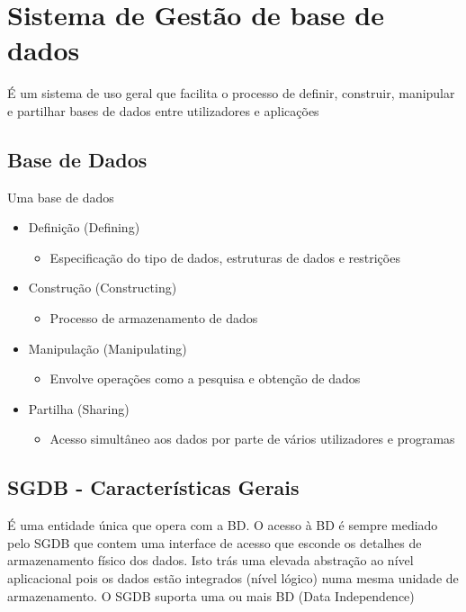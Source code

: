 \documentclass{easyclass}
\begin{document}
\section{Sistema de Gestão de base de dados}

\begin{tcolorbox}[
colframe=blue!25,
colback=blue!10,
coltitle=blue!20!black,  
fonttitle=\bfseries,
adjusted title=(DBMS) Database Management System]
É um sistema de uso geral que facilita o processo de definir, construir, manipular e partilhar bases de dados entre utilizadores e aplicações
\end{tcolorbox}

\subsection{Base de Dados}
Uma base de dados
\begin{itemize}
\item Definição (Defining)

\begin{itemize}
\item Especificação do tipo de dados, estruturas de dados e restrições
\end{itemize}

\item Construção (Constructing)
\begin{itemize}
\item Processo de armazenamento de dados
\end{itemize}

\item Manipulação (Manipulating)
\begin{itemize}
\item Envolve operações como a pesquisa e obtenção de dados
\end{itemize}

\item Partilha (Sharing)
\begin{itemize}
\item Acesso simultâneo aos dados por parte de vários utilizadores e programas
\end{itemize}

\end{itemize}

\subsection{SGDB - Características Gerais}
É uma entidade única que opera com a BD. O acesso à BD é sempre mediado pelo SGDB que contem uma interface de acesso que esconde os detalhes de armazenamento físico dos dados.  Isto trás uma elevada abstração ao nível aplicacional pois os dados estão integrados (nível lógico) numa mesma unidade de armazenamento. O SGDB suporta uma ou mais BD (Data Independence)
\end{document}
